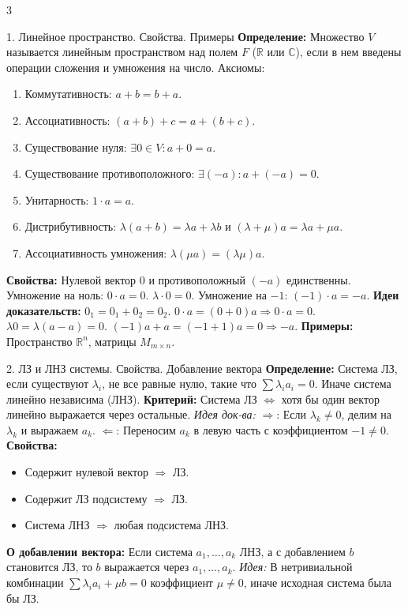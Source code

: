 \documentclass[8pt, a4paper, landscape]{extarticle}
\newcommand{\Ra}{\Rightarrow}
\begin{document}
\begin{multicols*}{3} 

\begin{ticket}{1. Линейное пространство. Свойства. Примеры}
\textbf{Определение:} Множество $V$ называется линейным пространством над полем $F$ ($\mathbb{R}$ или $\mathbb{C}$), если в нем введены операции сложения и умножения на число.
Аксиомы:
\begin{enumerate}
    \item Коммутативность: $a + b = b + a$.
    \item Ассоциативность: $(a + b) + c = a + (b + c)$.
    \item Существование нуля: $\exists 0 \in V: a + 0 = a$.
    \item Существование противоположного: $\exists (-a): a + (-a) = 0$.
    \item Унитарность: $1 \cdot a = a$.
    \item Дистрибутивность: $\lambda(a + b) = \lambda a + \lambda b$ и $(\lambda + \mu)a = \lambda a + \mu a$.
    \item Ассоциативность умножения: $\lambda(\mu a) = (\lambda\mu)a$.
\end{enumerate}
\tcblower
\textbf{Свойства:}
Нулевой вектор $0$ и противоположный $(-a)$ единственны.
Умножение на ноль: $0 \cdot a = 0$. $\lambda \cdot 0 = 0$.
Умножение на $-1$: $(-1) \cdot a = -a$.
\textbf{Идеи доказательств:} $0_1 = 0_1 + 0_2 = 0_2$. $0 \cdot a = (0+0)a \Ra 0 \cdot a = 0$. $\lambda 0 = \lambda(a-a)=0$. $(-1)a+a=(-1+1)a=0 \Ra -a$.
\textbf{Примеры:} Пространство $\mathbb{R}^n$, матрицы $M_{m \times n}$.
\end{ticket}

\begin{ticket}{2. ЛЗ и ЛНЗ системы. Свойства. Добавление вектора}
\textbf{Определение:} Система ЛЗ, если существуют $\lambda_i$, не все равные нулю, такие что $\sum \lambda_i a_i = 0$. Иначе система линейно независима (ЛНЗ).
\textbf{Критерий:} Система ЛЗ $\Leftrightarrow$ хотя бы один вектор линейно выражается через остальные.
\textit{Идея док-ва:} $\Rightarrow$: Если $\lambda_k \neq 0$, делим на $\lambda_k$ и выражаем $a_k$. $\Leftarrow$: Переносим $a_k$ в левую часть с коэффициентом $-1 \neq 0$.
\tcblower
\textbf{Свойства:}
\begin{itemize}
    \item Содержит нулевой вектор $\Ra$ ЛЗ.
    \item Содержит ЛЗ подсистему $\Ra$ ЛЗ.
    \item Система ЛНЗ $\Ra$ любая подсистема ЛНЗ.
\end{itemize}
\textbf{О добавлении вектора:} Если система $a_1, \dots, a_k$ ЛНЗ, а с добавлением $b$ становится ЛЗ, то $b$ выражается через $a_1, \dots, a_k$.
\textit{Идея:} В нетривиальной комбинации $\sum \lambda_i a_i + \mu b = 0$ коэффициент $\mu \neq 0$, иначе исходная система была бы ЛЗ.
\end{ticket}


\end{multicols*}
\end{document}
